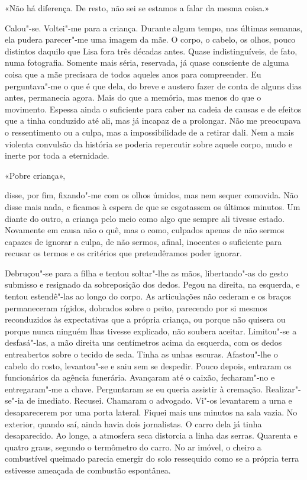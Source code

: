 «Não há diferença. De resto, não sei se estamos a falar da mesma coisa.»

Calou"-se. Voltei"-me para a criança. Durante algum tempo, nas últimas
semanas, ela pudera parecer"-me uma imagem da mãe. O corpo, o cabelo, os
olhos, pouco distintos daquilo que Lisa fora três décadas antes. Quase
indistinguíveis, de fato, numa fotografia. Somente mais séria,
reservada, já quase consciente de alguma coisa que a mãe precisara de
todos aqueles anos para compreender. Eu perguntava"-me o que é que dela,
do breve e austero fazer de conta de alguns dias antes, permanecia
agora. Mais do que a memória, mas menos do que o movimento. Espessa
ainda o suficiente para caber na cadeia de causas e de efeitos que a
tinha conduzido até ali, mas já incapaz de a prolongar. Não me
preocupava o ressentimento ou a culpa, mas a impossibilidade de a
retirar dali. Nem a mais violenta convulsão da história se poderia
repercutir sobre aquele corpo, mudo e inerte por toda a eternidade.

«Pobre criança»,

disse, por fim, fixando"-me com os olhos úmidos, mas nem sequer
comovida. Não disse mais nada, e ficamos à espera de que se esgotassem
os últimos minutos. Um diante do outro, a criança pelo meio como algo
que sempre ali tivesse estado. Novamente em causa não o quê, mas o como,
culpados apenas de não sermos capazes de ignorar a culpa, de não sermos,
afinal, inocentes o suficiente para recusar os termos e os critérios que
pretendêramos poder ignorar.

Debruçou"-se para a filha e tentou soltar"-lhe as mãos, libertando"-as
do gesto submisso e resignado da sobreposição dos dedos. Pegou na
direita, na esquerda, e tentou estendê"-las ao longo do corpo. As
articulações não cederam e os braços permaneceram rígidos, dobrados
sobre o peito, parecendo por si mesmos reconduzidos às expectativas que
a própria criança, ou porque não quisera ou porque nunca ninguém lhas
tivesse explicado, não soubera aceitar. Limitou"-se a desfasá"-las, a
mão direita uns centímetros acima da esquerda, com os dedos entreabertos
sobre o tecido de seda. Tinha as unhas escuras. Afastou"-lhe o cabelo do
rosto, levantou"-se e saiu sem se despedir. Pouco depois, entraram os
funcionários da agência funerária. Avançaram até o caixão, fecharam"-no
e entregaram"-me a chave. Perguntaram se eu queria assistir à cremação.
Realizar"-se"-ia de imediato. Recusei. Chamaram o advogado. Vi"-os
levantarem a urna e desaparecerem por uma porta lateral. Fiquei mais uns
minutos na sala vazia. No exterior, quando saí, ainda havia dois
jornalistas. O carro dela já tinha desaparecido. Ao longe, a atmosfera
seca distorcia a linha das serras. Quarenta e quatro graus, segundo o
termômetro do carro. No ar imóvel, o cheiro a combustível queimado
parecia emergir do solo ressequido como se a própria terra estivesse
ameaçada de combustão espontânea.

